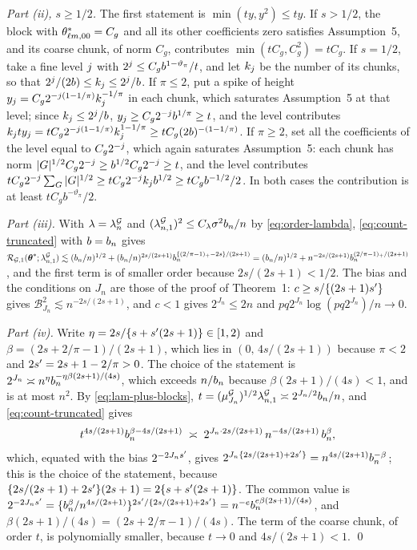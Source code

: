 \emph{Part (ii), $s \ge 1/2$.} The first statement is
$\min(ty,y^{2}) \le ty$. If $s > 1/2$, the block with
$\theta^{*}_{\ell m,00} = C_g$ and all its other coefficients zero satisfies
Assumption~5, and its coarse chunk, of norm $C_g$, contributes
$\min(tC_g,C_g^{2}) = tC_g$. If $s = 1/2$, take a fine level $j$ with
$2^{j} \le C_gb^{1-\vartheta_{\pi}}/t$, and let $k_{j}$ be the number of
its chunks, so that $2^{j}/(2b) \le k_{j} \le 2^{j}/b$. If
$\pi \le 2$, put a spike of height
$y_{j} = C_g2^{-j(1-1/\pi)}k_{j}^{-1/\pi}$ in each chunk, which
saturates Assumption~5 at that level; since $k_{j} \le 2^{j}/b$,
$y_{j} \ge C_g2^{-j}b^{1/\pi} \ge t$, and the level contributes
$k_{j}ty_{j} = tC_g2^{-j(1-1/\pi)}k_{j}^{1-1/\pi} \ge
tC_g(2b)^{-(1-1/\pi)}$. If $\pi \ge 2$, set all the coefficients of the level
equal to $C_g2^{-j}$, which again saturates Assumption~5: each chunk has
norm $|G|^{1/2}C_g2^{-j} \ge b^{1/2}C_g2^{-j} \ge t$, and the level
contributes $tC_g2^{-j}\sum_{G}|G|^{1/2} \ge tC_g2^{-j}k_{j}b^{1/2}
\ge tC_gb^{-1/2}/2$. In both cases the contribution is at least
$tC_gb^{-\vartheta_{\pi}}/2$.

\emph{Part (iii).} With $\lambda = \lambda^{\mathcal{G}}_{n}$ and
$(\lambda^{\mathcal{G}}_{n,1})^{2} \le C_{\lambda}\sigma^{2}b_{n}/n$ by \eqref{eq:order-lambda},
\eqref{eq:count-truncated} with $b = b_{n}$ gives
$\mathcal{R}_{\mathcal{G},1}(\boldsymbol{\theta}^{*};\lambda^{\mathcal{G}}_{n,1}) \lesssim (b_{n}/n)^{1/2} +
(b_{n}/n)^{2s/(2s+1)}b_{n}^{\{(2/\pi-1)_{+}-2s\}/(2s+1)} = (b_{n}/n)^{1/2} +
n^{-2s/(2s+1)}b_{n}^{(2/\pi-1)_{+}/(2s+1)}$, and the first term is of smaller
order because $2s/(2s+1) < 1/2$. The bias and the conditions on $J_n$ are
those of the proof of Theorem~1: $c \ge s/\{(2s+1)s'\}$ gives
$\mathcal{B}_{J_n}^{2} \lesssim n^{-2s/(2s+1)}$, and $c < 1$ gives
$2^{J_n} \le 2n$ and $pq2^{J_n}\log(pq2^{J_n})/n \to 0$.

\emph{Part (iv).} Write $\eta = 2s/\{s+s'(2s+1)\} \in [1,2)$ and
$\beta = (2s+2/\pi-1)/(2s+1)$, which lies in $(0,\,4s/(2s+1))$ because
$\pi < 2$ and $2s' = 2s+1-2/\pi > 0$. The choice of the statement is
$2^{J_n} \asymp n^{\eta}b_{n}^{-\eta\beta(2s+1)/(4s)}$, which exceeds $n/b_{n}$
because $\beta(2s+1)/(4s) < 1$, and is at most $n^{2}$. By
\eqref{eq:lam-plus-blocks}, $t = (\mu^{\mathcal{G}}_{J_n})^{1/2}\lambda^{\mathcal{G}}_{n,1} \asymp
2^{J_n/2}b_{n}/n$, and \eqref{eq:count-truncated} gives
\[
  t^{4s/(2s+1)}b_{n}^{\beta-4s/(2s+1)}
  \;\asymp\; 2^{J_n\cdot 2s/(2s+1)}\,n^{-4s/(2s+1)}\,b_{n}^{\beta},
\]
which, equated with the bias $2^{-2J_ns'}$, gives
$2^{J_n\{2s/(2s+1)+2s'\}} = n^{4s/(2s+1)}b_{n}^{-\beta}$; this is the choice
of the statement, because $\{2s/(2s+1)+2s'\}(2s+1) = 2\{s+s'(2s+1)\}$.
The common value is $2^{-2J_ns'} =
\{b_{n}^{\beta}/n^{4s/(2s+1)}\}^{2s'/\{2s/(2s+1)+2s'\}} =
n^{-e}b_{n}^{e\beta(2s+1)/(4s)}$, and $\beta(2s+1)/(4s) = (2s+2/\pi-1)/(4s)$.
The term of the coarse chunk, of order $t$, is polynomially smaller, because
$t \to 0$ and $4s/(2s+1) < 1$. \qed



